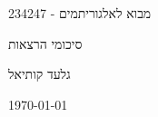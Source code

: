 \documentclass[]{book}
\begin{document}
	
	\begin{center}
		\vspace*{5cm}
		\Huge{מבוא לאלגוריתמים - 234247}

		\vspace{4cm}

		\huge{סיכומי הרצאות}

		\vspace{4cm}

		\Large{גלעד קותיאל}
		
		\today
	\end{center}

	\begingroup
		\let\cleardoublepage\clearpage
		\tableofcontents
	\endgroup

	\renewcommand{\chaptername}{הרצאה}

	
	
	
	
	
	
	
	
	
	
	
	
		
\end{document}
